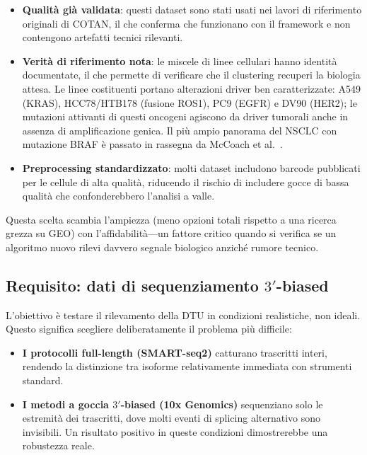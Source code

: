 \begin{itemize}
    \item \textbf{Qualità già validata}: questi dataset sono stati usati nei lavori di riferimento originali di COTAN, il che conferma che funzionano con il framework e non contengono artefatti tecnici rilevanti.
    \item \textbf{Verità di riferimento nota}: le miscele di linee cellulari hanno identità documentate, il che permette di verificare che il clustering recuperi la biologia attesa. Le linee costituenti portano alterazioni driver ben caratterizzate: A549 (KRAS\cite{meng2010kras}), HCC78/HTB178 (fusione ROS1\cite{davies2012identifying}), PC9 (EGFR\cite{simonetti2010detection}) e DV90 (HER2); le mutazioni attivanti di questi oncogeni agiscono da driver tumorali anche in assenza di amplificazione genica\cite{bose2013activating}. Il più ampio panorama del NSCLC con mutazione BRAF è passato in rassegna da McCoach et al.\ \cite{mccoach2020molecular}.
    \item \textbf{Preprocessing standardizzato}: molti dataset includono barcode pubblicati per le cellule di alta qualità, riducendo il rischio di includere gocce di bassa qualità che confonderebbero l'analisi a valle.
\end{itemize}


Questa scelta scambia l'ampiezza (meno opzioni totali rispetto a una ricerca grezza su GEO) con l'affidabilità---un fattore critico quando si verifica se un algoritmo nuovo rilevi davvero segnale biologico anziché rumore tecnico.

\subsection*{Requisito: dati di sequenziamento $3'$-biased}

L'obiettivo è testare il rilevamento della DTU in condizioni realistiche, non ideali. Questo significa scegliere deliberatamente il problema più difficile:
\begin{itemize}
    \item \textbf{I protocolli full-length (SMART-seq2)} catturano trascritti interi, rendendo la distinzione tra isoforme relativamente immediata con strumenti standard.
    \item \textbf{I metodi a goccia $3'$-biased (10x Genomics)} sequenziano solo le estremità dei trascritti, dove molti eventi di \gls{splicing} alternativo sono invisibili. Un risultato positivo in queste condizioni dimostrerebbe una robustezza reale.
\end{itemize}

